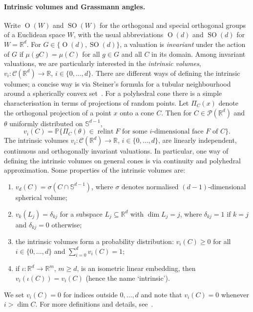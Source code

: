 \documentclass[11pt]{article}
\newcommand{\R}{\mathbb{R}}
\newcommand{\CC}{\mathcal{C}}
\newcommand{\PP}{\mathcal{P}}
\newcommand{\sphere}[1]{\mathbb{S}^{#1}}
\newcommand{\SOn}[1]{\operatorname{SO}(#1)}
\newcommand{\On}[1]{\operatorname{O}(#1)}
\newcommand{\SO}{\operatorname{SO}}
\newcommand{\Prob}{\mathbb{P}}
\newcommand{\relint}{\operatorname{relint}}
\theoremstyle{plain}
\theoremstyle{definition}
\begin{document}
\paragraph{Intrinsic volumes and Grassmann angles.} Write $\On W$ and
$\SO(W)$ for the orthogonal and special orthogonal groups of a Euclidean
space $W$, with the usual abbreviations $\On d$ and $\SOn d$ for $W=\R^d$.
For $G\in \{\On{d}, \SOn{d}\}$, a valuation
is {\em invariant} under the action of $G$ if $\mu(gC)=\mu(C)$ for all $g\in G$ and all $C$ in its domain. Among invariant valuations, we are particularly interested in the \emph{intrinsic volumes}, $v_i\colon\CC(\R^d)\to\R$, $i\in \{0,\ldots,d\}$. There are different ways of defining the intrinsic volumes; a concise way is via Steiner's formula for a tubular neighbourhood around a spherically convex set~\cite[Chapter 4]{Sch22:Convex-Cones}. For a polyhedral cone there is a simple characterisation in terms of projections of random points. Let $\Pi_C(x)$ denote the orthogonal projection of a point $x$ onto a cone $C$. Then for $C\in \PP(\R^d)$ and $\theta$ uniformly distributed on $\sphere{d-1}$,
\begin{equation*}
  v_i(C) = \Prob\{\Pi_C(\theta)\in\relint F
                 \text{ for some $i$-dimensional face $F$ of $C$}\}.
\end{equation*}
The intrinsic volumes $v_i\colon\CC(\R^d)\to\R$, $i\in \{0,\ldots,d\}$, are linearly independent, continuous and orthogonally invariant valuations. In particular, one way of defining the intrinsic volumes on general cones is via
continuity and polyhedral approximation.
Some properties of the intrinsic volumes are:
\begin{enumerate}
\item $v_d(C)=\sigma(C\cap \sphere{d-1})$, where $\sigma$ denotes normalised $(d-1)$-dimensional spherical volume;
\item $v_k(L_j)=\delta_{kj}$ for a subspace $L_j\subseteq \R^d$ with $\dim L_j=j$, where $\delta_{kj}=1$ if $k=j$ and $\delta_{kj}=0$ otherwise;
\item the intrinsic volumes form a probability distribution: $v_i(C)\geq 0$ for all $i\in \{0,\dots,d\}$ and $\sum_{i=0}^d v_i(C)=1$;
\item if $\iota \colon\R^d\to\R^m$, $m\geq d$, is an isometric linear embedding, then $v_i(\iota(C))=v_i(C)$ (hence the name `intrinsic').
\end{enumerate}
We set $v_i(C)=0$ for indices outside $0,\ldots,d$ and note that $v_i(C)=0$
whenever $i>\dim C$.
For more definitions and details, see~\cite[Sections~2.3 and 4.2]{Sch22:Convex-Cones}.
\end{document}
